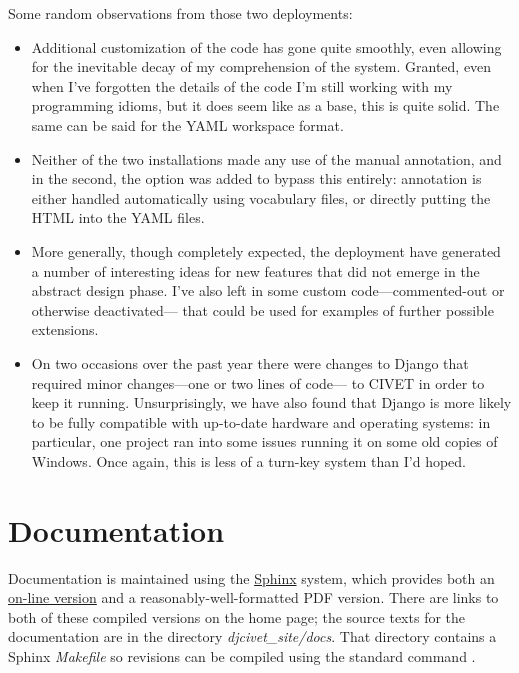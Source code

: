 \documentclass[letterpaper,10pt,english]{sphinxmanual}
\begin{document}
Some random observations from those two deployments:
\begin{itemize}
\item {} 
Additional customization of the code has gone quite smoothly, even
allowing for the inevitable decay of my comprehension of the
system. Granted, even when I've forgotten the details of the code
I'm still working with my programming idioms, but it does seem like as a
base, this is quite solid. The same can be said for the YAML
workspace format.

\item {} 
Neither of the two installations made any use of the manual
annotation, and in the second, the  option was
added to bypass this entirely: annotation is either handled
automatically using vocabulary files, or directly putting the
HTML into the YAML files.

\item {} 
More generally, though completely expected, the deployment have
generated a number of interesting ideas for new features that
did not emerge in the abstract design phase. I've also left
in some custom code—commented-out or otherwise deactivated—
that could be used for examples of further possible extensions.

\item {} 
On two occasions over the past year there were changes to
Django that required minor changes—one or two lines of code—
to CIVET in order to keep it running. Unsurprisingly, we have
also found that Django is more likely to be fully compatible
with up-to-date hardware
and operating systems: in particular, one project ran into some
issues running it on some old copies of Windows. Once again, this is
less of a turn-key system than I'd hoped.

\end{itemize}


\section{Documentation}
\label{intro:documentation}
Documentation is maintained using the \href{http://http://sphinx-doc.org/}{Sphinx} system, which provides both an
\href{http://civet.parusanalytics.com/civetdocs/index.html}{on-line version} and a reasonably-well-formatted PDF version. There
are links to both of these compiled versions on the home page; the  source texts for the documentation are in the
directory \emph{djcivet\_site/docs}. That directory contains a Sphinx \emph{Makefile} so revisions can be compiled using the standard
command .
\end{document}
